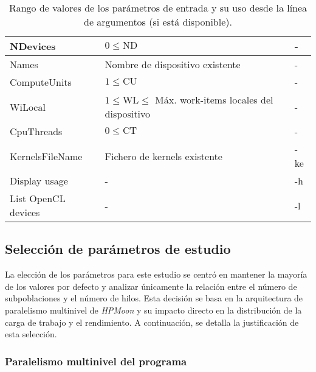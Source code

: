 \begin{table}[htbp]
\begin{tabular}{|p{3cm}|p{6cm}|p{2.2cm}|}
        NDevices            & $0 \leq \mathrm{ND}$                                                    & -                   \\ \hline
        Names               & Nombre de dispositivo existente                                         & -                   \\ \hline
        ComputeUnits        & $1 \leq \mathrm{CU}$                                                    & -                   \\ \hline
        WiLocal             & $1 \leq \mathrm{WL} \leq$ Máx. work-items locales del dispositivo       & -                   \\ \hline
        CpuThreads          & $0 \leq \mathrm{CT}$                                                    & -                   \\ \hline
        KernelsFileName     & Fichero de kernels existente                                            & -ke                 \\ \hline
        Display usage       & -                                                                       & -h                  \\ \hline
        List OpenCL devices & -                                                                       & -l                  \\ \hline
    \end{tabular}
    \caption{Rango de valores de los parámetros de entrada y su uso desde la línea de argumentos (si está disponible).}
    \label{tab:HPMoon_parametros}
\end{table}

\subsection{Selección de parámetros de estudio}\label{subsec:seleccion_parametros_estudio}

La elección de los parámetros para este estudio se centró en mantener la mayoría de los valores por defecto y analizar únicamente la relación entre el número de subpoblaciones y el número de hilos. Esta decisión se basa en la arquitectura de paralelismo multinivel de \textit{HPMoon} y su impacto directo en la distribución de la carga de trabajo y el rendimiento. A continuación, se detalla la justificación de esta selección.

\subsubsection{Paralelismo multinivel del programa}

